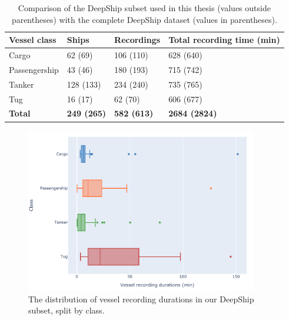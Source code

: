 \begin{table}[tb]
\centering
\begin{tabular}{llll}
\toprule
\textbf{Vessel class} & \textbf{Ships} & \textbf{Recordings} & \textbf{Total recording time (min)} \\ \midrule
Cargo & 62 (69) & 106 (110) & 628 (640) \\
Passengership & 43 (46) & 180 (193) & 715 (742) \\
Tanker & 128 (133) & 234 (240) & 735 (765) \\
Tug & 16 (17) & 62 (70) & 606 (677) \\
\textbf{Total} & \textbf{249 (265)} & \textbf{582 (613)} & \textbf{2684 (2824)} \\ \bottomrule
\end{tabular}
\caption{Comparison of the DeepShip subset used in this thesis (values outside parentheses) with the complete DeepShip dataset (values in parentheses).}
\label{tab:deepship-subset}
\end{table}

\begin{figure}[p]
    \centering
    \includegraphics[width=0.9\textwidth]{img/ch3/deepship_duration_spread.pdf}
    \caption{The distribution of vessel recording durations in our DeepShip subset, split by class.}
    \label{fig:deepship-subset-recording-length}
\end{figure}

